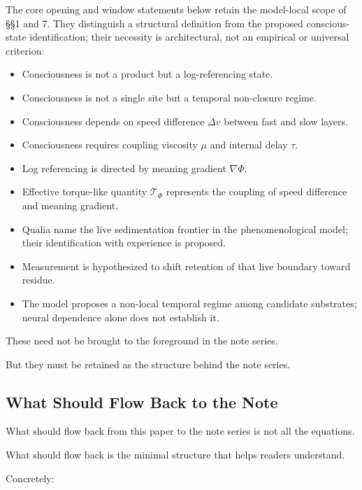 The core opening and window statements below retain the model-local scope of §§1 and 7. They distinguish a structural definition from the proposed conscious-state identification; their necessity is architectural, not an empirical or universal criterion:

\begin{itemize}
\item Consciousness is not a product but a log-referencing state.
\item Consciousness is not a single site but a temporal non-closure regime.
\item Consciousness depends on speed difference $\Delta v$ between fast and slow layers.
\item Consciousness requires coupling viscosity $\mu$ and internal delay $\tau$.
\item Log referencing is directed by meaning gradient $\nabla\Phi$.
\item Effective torque-like quantity $\mathcal{T}_{\Phi}$ represents the coupling of speed difference and meaning gradient.
\item Qualia name the live sedimentation frontier in the phenomenological model; their identification with experience is proposed.
\item Measurement is hypothesized to shift retention of that live boundary toward residue.
\item The model proposes a non-local temporal regime among candidate substrates; neural dependence alone does not establish it.
\end{itemize}

These need not be brought to the foreground in the note series.

But they must be retained as the structure behind the note series.

\subsection{What Should Flow Back to the Note}


What should flow back from this paper to the note series is not all the equations.

What should flow back is the minimal structure that helps readers understand.

Concretely:

